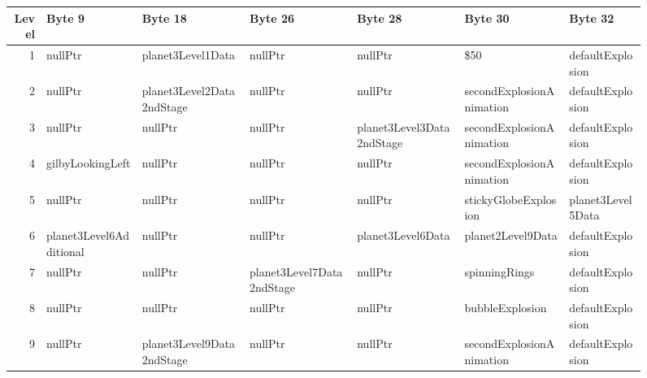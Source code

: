 \begin{figure}[H]
  {
    \setlength{\tabcolsep}{3.0pt}
    \setlength\cmidrulewidth{\heavyrulewidth} %
    \begin{adjustbox}{width=\textwidth}

      \begin{tabular}{rllllll}
        \toprule
        Level & Byte 9                  & Byte 18                    & Byte 26                   & Byte 28                   & Byte 30                    & Byte 32                    \\
        \midrule
        1 & nullPtr                 & planet3Level1Data          & nullPtr                   & nullPtr                   & \$50                        & defaultExplosion           \\
        2 & nullPtr                 & planet3Level2Data2ndStage  & nullPtr                   & nullPtr                   & secondExplosionAnimation   & defaultExplosion           \\
        3 & nullPtr                 & nullPtr                    & nullPtr                   & planet3Level3Data2ndStage & secondExplosionAnimation   & defaultExplosion           \\
        4 & gilbyLookingLeft        & nullPtr                    & nullPtr                   & nullPtr                   & secondExplosionAnimation   & defaultExplosion           \\
        5 & nullPtr                 & nullPtr                    & nullPtr                   & nullPtr                   & stickyGlobeExplosion       & planet3Level5Data          \\
        6 & planet3Level6Additional & nullPtr                    & nullPtr                   & planet3Level6Data         & planet2Level9Data          & defaultExplosion           \\
        7 & nullPtr                 & nullPtr                    & planet3Level7Data2ndStage & nullPtr                   & spinningRings              & defaultExplosion           \\
        8 & nullPtr                 & nullPtr                    & nullPtr                   & nullPtr                   & bubbleExplosion            & defaultExplosion           \\
        9 & nullPtr                 & planet3Level9Data2ndStage  & nullPtr                   & nullPtr                   & secondExplosionAnimation   & defaultExplosion           \\

\end{tabular}
\end{adjustbox}}
\end{figure}
